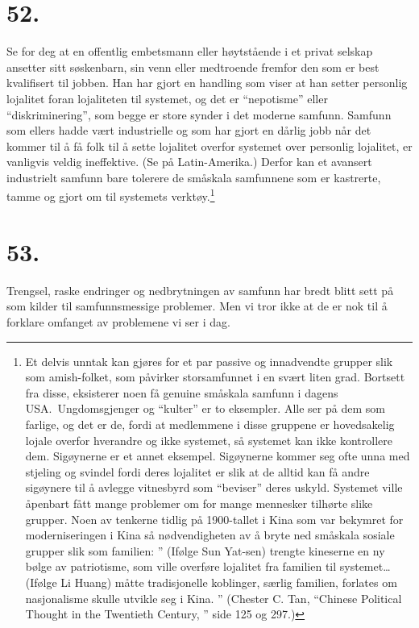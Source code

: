 \documentclass[oneside]{book}
\begin{document}
\section*{52.}
Se for deg at en offentlig embetsmann eller høytstående i et privat selskap
ansetter sitt søskenbarn, sin venn eller medtroende fremfor den som er best
kvalifisert til jobben. Han har gjort en handling som viser at han setter
personlig lojalitet foran lojaliteten til systemet, og det er ``nepotisme''
eller ``diskriminering'', som begge er store synder i det moderne samfunn.
Samfunn som ellers hadde vært industrielle og som har gjort en dårlig jobb når
det kommer til å få folk til å sette lojalitet overfor systemet over personlig
lojalitet, er vanligvis veldig ineffektive. (Se på Latin-Amerika.) Derfor kan
et avansert industrielt samfunn bare tolerere de småskala samfunnene som er
kastrerte, tamme og gjort om til systemets verktøy.\footnote{Et delvis unntak
kan gjøres for et par passive og innadvendte grupper slik som amish-folket, som
påvirker storsamfunnet i en svært liten grad. Bortsett fra disse, eksisterer
noen få genuine småskala samfunn i dagens USA.\ Ungdomsgjenger og ``kulter'' er
to eksempler. Alle ser på dem som farlige, og det er de, fordi at medlemmene i
disse gruppene er hovedsakelig lojale overfor hverandre og ikke systemet, så
systemet kan ikke kontrollere dem. Sigøynerne er et annet eksempel. Sigøynerne
kommer seg ofte unna med stjeling og svindel fordi deres lojalitet er slik at
de alltid kan få andre sigøynere til å avlegge vitnesbyrd som ``beviser'' deres
uskyld. Systemet ville åpenbart fått mange problemer om for mange mennesker
tilhørte slike grupper. Noen av tenkerne tidlig på 1900-tallet i Kina som var
bekymret for moderniseringen i Kina så nødvendigheten av å bryte ned småskala
sosiale grupper slik som familien: '' (Ifølge Sun Yat-sen) trengte kineserne en
ny bølge av patriotisme, som ville overføre lojalitet fra familien til
systemet\ldots (Ifølge Li Huang) måtte tradisjonelle koblinger, særlig familien,
forlates om nasjonalisme skulle utvikle seg i Kina. '' (Chester C. Tan,
``Chinese Political Thought in the Twentieth Century, '' side 125 og 297.)}

\section*{53.}
Trengsel, raske endringer og nedbrytningen av samfunn har bredt blitt sett på
som kilder til samfunnsmessige problemer. Men vi tror ikke at de er nok til å
forklare omfanget av problemene vi ser i dag. 
\end{document}
